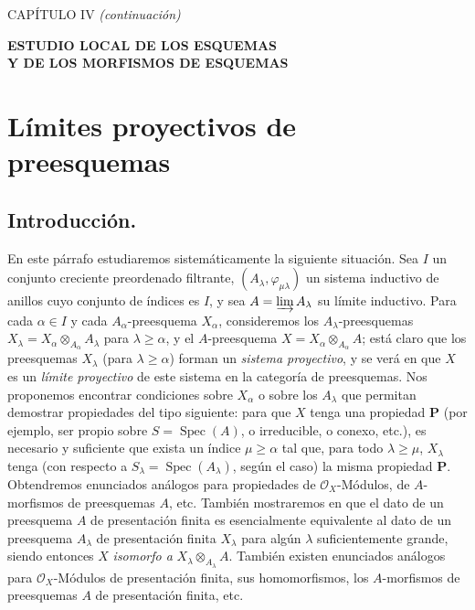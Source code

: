 \clearpage
\thispagestyle{plain}
\label{chapter:IV3-fr}

\begin{center}
{\large CAPÍTULO IV \textit{(continuación)}\par}
\vspace{1.5em}
{\Large\bfseries ESTUDIO LOCAL DE LOS ESQUEMAS\\
Y DE LOS MORFISMOS DE ESQUEMAS\par}
\end{center}

\setcounter{section}{7}
\section{Límites proyectivos de preesquemas}
\label{section:IV.8-fr}

\setcounter{subsection}{0}
\subsection{Introducción.}
\label{subsection:IV.8.1-fr}

\begin{env}[8.1.1]
\label{IV.8.1.1-fr}
En este párrafo estudiaremos sistemáticamente la siguiente situación.
Sea $I$ un conjunto creciente preordenado filtrante, $(A_\lambda,\varphi_{\mu\lambda})$ un sistema inductivo de anillos cuyo conjunto de índices es $I$, y sea $A=\varinjlim A_\lambda$ su límite inductivo.
Para cada $\alpha\in I$ y cada $A_\alpha$-preesquema $X_\alpha$, consideremos los $A_\lambda$-preesquemas $X_\lambda=X_\alpha\otimes_{A_\alpha}A_\lambda$ para $\lambda\geq\alpha$, y el $A$-preesquema $X=X_\alpha\otimes_{A_\alpha}A$; está claro que los preesquemas $X_\lambda$ (para $\lambda\geq\alpha$) forman un \emph{sistema proyectivo}, y se verá en  que $X$ es un \emph{límite proyectivo} de este sistema en la categoría de preesquemas.
Nos proponemos encontrar condiciones sobre $X_\alpha$ o sobre los $A_\lambda$ que permitan demostrar propiedades del tipo siguiente:
para que $X$ tenga una propiedad $\boldsymbol{P}$ (por ejemplo, ser propio sobre $S=\operatorname{Spec}(A)$, o irreducible, o conexo, etc.), es necesario y suficiente que exista un índice $\mu\geq\alpha$ tal que, para todo $\lambda\geq\mu$, $X_\lambda$ tenga (con respecto a $S_\lambda=\operatorname{Spec}(A_\lambda)$, según el caso) la misma propiedad $\boldsymbol{P}$.
Obtendremos enunciados análogos para propiedades de $\mathcal O_X$-Módulos, de $A$-morfismos de preesquemas $A$, etc.
También mostraremos en  que el dato de un preesquema $A$ de presentación finita  es esencialmente equivalente al dato de un preesquema $A_\lambda$ de presentación finita $X_\lambda$ para algún $\lambda$ suficientemente grande, siendo entonces $X$ \emph{isomorfo a} $X_\lambda\otimes_{A_\lambda}A$.
También existen enunciados análogos para $\mathcal O_X$-Módulos de presentación finita, sus homomorfismos, los $A$-morfismos de preesquemas $A$ de presentación finita, etc.
\end{env}

